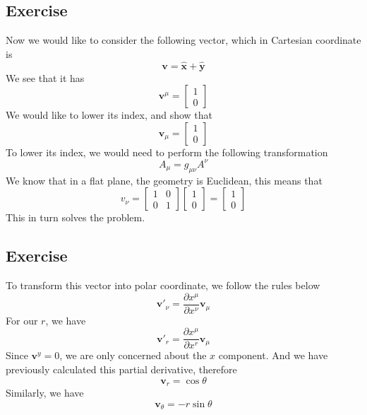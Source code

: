\documentclass[12pt]{memoir}
\newcommand{\pypx}[2]{\frac{\partial #1}{\partial #2}}
\newcommand{\unx}{\hat{\mathbf{x}}}
\newcommand{\uny}{\hat{\mathbf{y}}}
\begin{document}
    \subsection{Exercise}
    Now we would like to consider the following vector, which in Cartesian coordinate is
    \[
    \mathbf{v} = \unx + \uny
    \]
    We see that it has
    \[
    \mathbf{v}^{\mu} = \begin{bmatrix}
        1\\0
    \end{bmatrix}
    \]
    We would like to lower its index, and show that
    \[
    \mathbf{v}_{\mu} = \begin{bmatrix}
        1\\0
    \end{bmatrix}
    \]
    To lower its index, we would need to perform the following transformation
    \[
    A_{\mu} = g_{\mu\nu}A^{\nu}
    \]
    We know that in a flat plane, the geometry is Euclidean, this means that 
    \[
    v_{\nu} = \begin{bmatrix}
        1&0\\0&1
    \end{bmatrix}
    \begin{bmatrix}
        1\\0
    \end{bmatrix} = \begin{bmatrix}
        1\\0
    \end{bmatrix}
    \]
    This in turn solves the problem.
    
    \subsection{Exercise}
    To transform this vector into polar coordinate, we follow the rules below
    \[
    \mathbf{v}'_{\nu} = \pypx{x^\mu}{x^\nu}\mathbf{v}_\mu
    \]
    For our $r$, we have
    \[
    \mathbf{v}'_{r} = \pypx{x^\mu}{x^r}\mathbf{v}_\mu
    \]
    Since $\mathbf{v}^y = 0$, we are only concerned about the $x$ component. And we have previously calculated this partial derivative, therefore
    \[
    \mathbf{v}_{r} = \cos\theta
    \]
    Similarly, we have
    \[
    \mathbf{v}_{\theta} = -r\sin\theta
    \]
\end{document}
